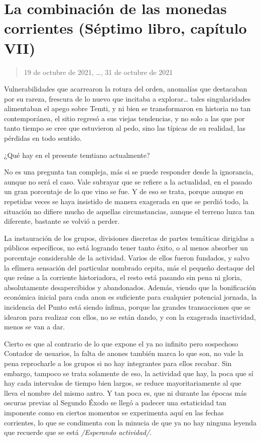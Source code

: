 \documentclass[
  spanish,
]{book}
\begin{document}
\hypertarget{la-combinaciuxf3n-de-las-monedas-corrientes-suxe9ptimo-libro-capuxedtulo-vii}{%
\section{La combinación de las monedas corrientes (Séptimo libro, capítulo VII)}\label{la-combinaciuxf3n-de-las-monedas-corrientes-suxe9ptimo-libro-capuxedtulo-vii}}

\begin{quote}
19 de octubre de 2021, \ldots, 31 de octubre de 2021
\end{quote}

Vulnerabilidades que acarrearon la rotura del orden, anomalías que destacaban por su rareza, frescura de lo nuevo que incitaba a explorar\ldots{} tales singularidades alimentaban el apego sobre Temti, y ni bien se transformaron en historia no tan contemporánea, el sitio regresó a sus viejas tendencias, y no solo a las que por tanto tiempo se cree que estuvieron al pedo, sino las típicas de su realidad, las pérdidas en todo sentido.

¿Qué hay en el presente temtiano actualmente?

No es una pregunta tan compleja, más si se puede responder desde la ignorancia, aunque no será el caso. Vale subrayar que se refiere a la actualidad, en el pasado un gran porcentaje de lo que vino se fue. Y de eso se trata, porque aunque en repetidas veces se haya insistido de manera exagerada en que se perdió todo, la situación no difiere mucho de aquellas circunstancias, aunque el terreno luzca tan diferente, bastante se volvió a perder.

La instauración de los grupos, divisiones discretas de partes temáticas dirigidas a públicos específicos, no está logrando tener tanto éxito, o al menos absorber un porcentaje considerable de la actividad. Varios de ellos fueron fundados, y salvo la efímera sensación del particular nombrado cepita, más el pequeño destaque del que reúne a la corriente historiadora, el resto está pasando sin pena ni gloria, absolutamente desapercibidos y abandonados. Además, viendo que la bonificación económica inicial para cada anon es suficiente para cualquier potencial jornada, la incidencia del Punto está siendo ínfima, porque las grandes transacciones que se idearon para realizar con ellos, no se están dando, y con la exagerada inactividad, menos se van a dar.

Cierto es que al contrario de lo que expone el ya no infinito pero sospechoso Contador de usuarios, la falta de anones también marca lo que son, no vale la pena reprocharle a los grupos si no hay integrantes para ellos recabar. Sin embargo, tampoco se trata solamente de eso, la actividad que hay, la poca que sí hay cada intervalos de tiempo bien largos, se reduce mayoritariamente al que lleva el nombre del mismo antro. Y tan poca es, que ni durante las épocas más oscuras previas al Segundo Éxodo se llegó a padecer una estaticidad tan imponente como en ciertos momentos se experimenta aquí en las fechas corrientes, lo que se condimenta con la minucia de que ya no hay ninguna leyenda que recuerde que se está \emph{/Esperando actividad/}.
\end{document}
